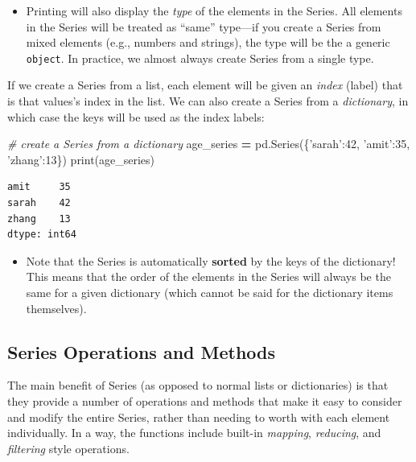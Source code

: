 \documentclass[]{book}
\newenvironment{Shaded}{\begin{snugshade}}{\end{snugshade}}
\newcommand{\DecValTok}[1]{\textcolor[rgb]{0.00,0.00,0.81}{#1}}
\newcommand{\StringTok}[1]{\textcolor[rgb]{0.31,0.60,0.02}{#1}}
\newcommand{\CommentTok}[1]{\textcolor[rgb]{0.56,0.35,0.01}{\textit{#1}}}
\newcommand{\OperatorTok}[1]{\textcolor[rgb]{0.81,0.36,0.00}{\textbf{#1}}}
\newcommand{\BuiltInTok}[1]{#1}
\newcommand{\NormalTok}[1]{#1}
\providecommand{\tightlist}{%
  \setlength{\itemsep}{0pt}\setlength{\parskip}{0pt}}
\begin{document}
\begin{itemize}
\tightlist
\item
  Printing will also display the \emph{type} of the elements in the
  Series. All elements in the Series will be treated as ``same''
  type---if you create a Series from mixed elements (e.g., numbers and
  strings), the type will be the a generic \texttt{object}. In practice,
  we almost always create Series from a single type.
\end{itemize}

If we create a Series from a list, each element will be given an
\emph{index} (label) that is that values's index in the list. We can
also create a Series from a \emph{dictionary}, in which case the keys
will be used as the index labels:

\begin{Shaded}
\begin{Highlighting}[]
\CommentTok{# create a Series from a dictionary}
\NormalTok{age_series }\OperatorTok{=}\NormalTok{ pd.Series(\{}\StringTok{'sarah'}\NormalTok{:}\DecValTok{42}\NormalTok{, }\StringTok{'amit'}\NormalTok{:}\DecValTok{35}\NormalTok{, }\StringTok{'zhang'}\NormalTok{:}\DecValTok{13}\NormalTok{\})}
\BuiltInTok{print}\NormalTok{(age_series)}
\end{Highlighting}
\end{Shaded}

\begin{verbatim}
amit     35
sarah    42
zhang    13
dtype: int64
\end{verbatim}

\begin{itemize}
\tightlist
\item
  Note that the Series is automatically \textbf{sorted} by the keys of
  the dictionary! This means that the order of the elements in the
  Series will always be the same for a given dictionary (which cannot be
  said for the dictionary items themselves).
\end{itemize}

\hypertarget{series-operations-and-methods}{\subsection{Series
Operations and Methods}\label{series-operations-and-methods}}

The main benefit of Series (as opposed to normal lists or dictionaries)
is that they provide a number of operations and methods that make it
easy to consider and modify the entire Series, rather than needing to
worth with each element individually. In a way, the functions include
built-in \emph{mapping}, \emph{reducing}, and \emph{filtering} style
operations.
\end{document}
